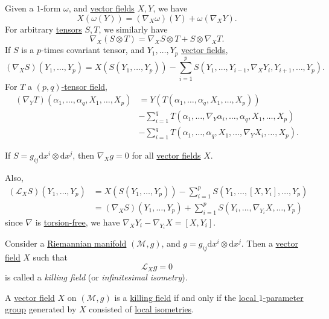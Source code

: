 Given a \(1\)-form \(\omega \), and \hyperref[def:vector-field]{vector fields} \(X, Y\), we have
\[
	X(\omega (Y)) = (\nabla _X \omega )(Y) + \omega (\nabla _X Y).
\]
For arbitrary \hyperref[def:tensor]{tensors} \(S, T\), we similarly have
\[
	\nabla _X (S \otimes T) = \nabla _X S \otimes T + S \otimes \nabla _X T.
\]
If \(S\) is a \(p\)-times covariant tensor, and \(Y_1, \ldots , Y_p\) \hyperref[def:vector-field]{vector fields},
\[
	(\nabla _X S) ( Y_1, \ldots , Y_p) = X(S(Y_1, \ldots , Y_p)) - \sum_{i=1}^{p} S(Y_1, \ldots , Y_{i-1}, \nabla _X Y_i, Y_{i+1}, \ldots , Y_p ).
\]
For \(T\) a \hyperref[def:tensor]{\((p, q)\)-tensor field},
\[
	\begin{split}
		(\nabla _Y T) ( \alpha _1, \ldots , \alpha _q, X_1, \ldots , X_p)
		&= Y(T(\alpha _1, \ldots , \alpha _q, X_1, \ldots , X_p))\\
		&- \sum_{i=1}^{q} T(\alpha _1, \ldots , \nabla _Y \alpha _i, \ldots , \alpha _q , X_1, \ldots , X_p)\\
		&- \sum_{i=1}^{q} T(\alpha _1, \ldots , \alpha _q, X_1, \ldots , \nabla _Y X_i, \ldots , X_p).
	\end{split}
\]

If \(S = g_{ij} \mathrm{d} x^i \otimes \mathrm{d} x^j\), then \(\nabla _X g = 0\) for all \hyperref[def:vector-field]{vector fields} \(X\).

Also,
\[
	\begin{split}
		(\mathcal{L} _X S) (Y_1, \ldots , Y_p)
		&=X(S(Y_1, \ldots , Y_p))
		- \sum_{i=1}^{p} S(Y_1, \ldots , [X, Y_i], \ldots , Y_p)\\
		&= (\nabla _X S)(Y_1, \ldots , Y_p) + \sum_{i=1}^{p} S(Y_i, \ldots , \nabla _{Y_i}X, \ldots , Y_p)
	\end{split}
\]
since \(\nabla \) is \hyperref[def:torsion-free]{torsion-free}, we have \(\nabla _X Y_i - \nabla _{Y_i}X = [X, Y_i]\).

\begin{definition}\label{def:killing-field}
	Consider a \hyperref[def:Riemannian-manifold]{Riemannian manifold} \((\mathcal{M} , g)\), and \(g = g_{ij} \mathrm{d} x^i \otimes \mathrm{d} x^j \). Then a \hyperref[def:vector-field]{vector field} \(X\) such that
	\[
		\mathcal{L} _X g = 0
	\]
	is called a \emph{killing field} (or \emph{infinitesimal isometry}).
\end{definition}

\begin{lemma}
	A \hyperref[def:vector-field]{vector field} \(X\) on \((\mathcal{M} , g)\) is a \hyperref[def:killing-field]{killing field} if and only if the \hyperref[def:local-1-parameter-group]{local \(1\)-parameter group} generated by \(X\) consisted of \hyperref[def:local-isometry]{local isometries}.
\end{lemma}

